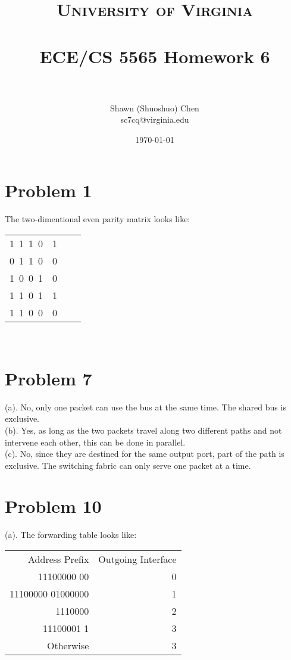\documentclass[titlepage, paper=a4, fontsize=11pt]{scrartcl} %
\title{	
\normalfont \normalsize 
\textsc{University of Virginia} \\ [25pt] %
\horrule{0.5pt} \\[0.4cm] %
\huge ECE/CS 5565 Homework 6 \\ %
\horrule{2pt} \\[0.5cm] %
}
\author{Shawn (Shuoshuo) Chen\\sc7cq@virginia.edu} %
\date{\normalsize\today} %
\numberwithin{equation}{section} %
\numberwithin{table}{section} %
\begin{document}
\maketitle %


\section*{Problem 1}
The two-dimentional even parity matrix looks like:
\begin{tabular}{ r | r | r | r }
  1\ 1\ 1\ 0 & 1 \\
  0\ 1\ 1\ 0 & 0 \\
  1\ 0\ 0\ 1 & 0 \\
  1\ 1\ 0\ 1 & 1 \\
  \hline
  1\ 1\ 0\ 0 & 0 \\
\end{tabular}
\\



\section*{Problem 7}
(a).
No, only one packet can use the bus at the same time. The shared bus is exclusive. \\

(b).
Yes, as long as the two packets travel along two different paths and not intervene each other, this can be done in parallel. \\

(c).
No, since they are destined for the same output port, part of the path is exclusive. The switching fabric can only serve one packet at a time. \\




\section*{Problem 10}
(a).
The forwarding table looks like: \\
\begin{tabular}{ r | r  }
  Address Prefix & Outgoing Interface \\
  11100000 00 & 0 \\
  11100000 01000000 & 1 \\
  1110000 & 2 \\
  11100001 1 & 3 \\
  Otherwise & 3 \\
\end{tabular}
\\
\end{document}

